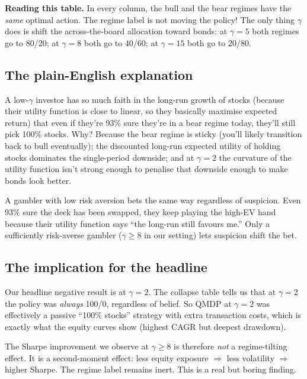 \documentclass[11pt]{article}
\begin{document}
\textbf{Reading this table.} In every column, the bull and the bear regimes have the \emph{same} optimal action. The regime label is not moving the policy! The only thing $\gamma$ does is shift the across-the-board allocation toward bonds: at $\gamma = 5$ both regimes go to 80/20; at $\gamma = 8$ both go to 40/60; at $\gamma = 15$ both go to 20/80.

\subsection{The plain-English explanation}

\begin{plainenglish}
A low-$\gamma$ investor has so much faith in the long-run growth of stocks (because their utility function is close to linear, so they basically maximise expected return) that even if they're 93\% sure they're in a bear regime today, they'll still pick 100\% stocks. Why? Because the bear regime is sticky (you'll likely transition back to bull eventually); the discounted long-run expected utility of holding stocks dominates the single-period downside; and at $\gamma = 2$ the curvature of the utility function isn't strong enough to penalise that downside enough to make bonds look better.
\end{plainenglish}

\begin{analogy}
A gambler with low risk aversion bets the same way regardless of suspicion. Even 93\% sure the deck has been swapped, they keep playing the high-EV hand because their utility function says ``the long-run still favours me.'' Only a sufficiently risk-averse gambler ($\gamma \geq 8$ in our setting) lets suspicion shift the bet.
\end{analogy}

\subsection{The implication for the headline}

Our headline negative result is at $\gamma = 2$. The collapse table tells us that at $\gamma = 2$ the policy was \emph{always} 100/0, regardless of belief. So QMDP at $\gamma = 2$ was effectively a passive ``100\% stocks'' strategy with extra transaction costs, which is exactly what the equity curves show (highest CAGR but deepest drawdown).

The Sharpe improvement we observe at $\gamma \geq 8$ is therefore \emph{not} a regime-tilting effect. It is a second-moment effect: less equity exposure $\Rightarrow$ less volatility $\Rightarrow$ higher Sharpe. The regime label remains inert. This is a real but boring finding.
\end{document}
